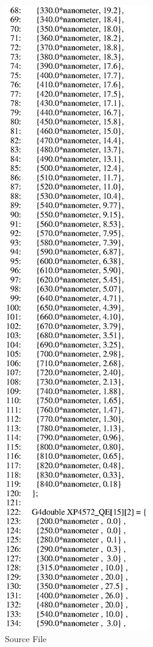 \begin{figure}[h]
  \hspace{0cm}
  \includegraphics[scale=0.8]{./figures18/QweakSimUserInformation.cc-p2.eps}
  \caption{\label{SourceXVIII4} Source File}
           \label{fig:XVIII-SC-4}
\end{figure}
\clearpage

